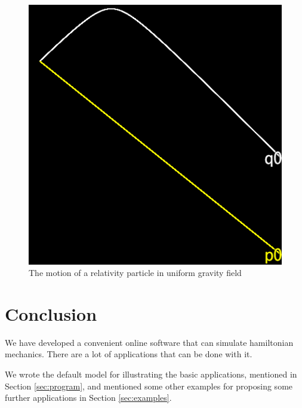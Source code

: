 \documentclass[12pt]{article}
\begin{document}
\begin{figure}[h]
  \centering
  \includegraphics[width=0.4\linewidth]{relativity_gravity.png}
  \caption{The motion of a relativity particle in uniform gravity field}
  \label{fig:relativity}
\end{figure}

\section{Conclusion}

We have developed a convenient online software that can simulate hamiltonian mechanics.
There are a lot of applications that can be done with it.

We wrote the default model for illustrating the basic applications, mentioned in Section \ref{sec:program},
and mentioned some other examples for proposing some further applications in Section \ref{sec:examples}.



\end{document}
